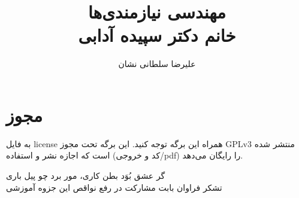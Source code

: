 \documentclass[a4paper]{article}
\title{مهندسی نیازمندی‌ها \\ خانم دکتر سپیده آدابی}
\author{علیرضا سلطانی نشان}
\begin{document}
\maketitle
\tableofcontents

\section*{مجوز}

به فایل license همراه این برگه توجه کنید. این برگه تحت مجوز GPLv3 منتشر شده است
که اجازه نشر و استفاده (کد و خروجی/pdf) را رایگان می‌دهد.











\newpage
\listoffigures
\listoftables

\newpage
\vspace*{\fill}
\centering
گر عشق بُوَد بطن کاری، مور برد چو پیل باری \\
تشکر فراوان بابت مشارکت در رفع نواقص این جزوه آموزشی
\vspace*{\fill}
\end{document}
